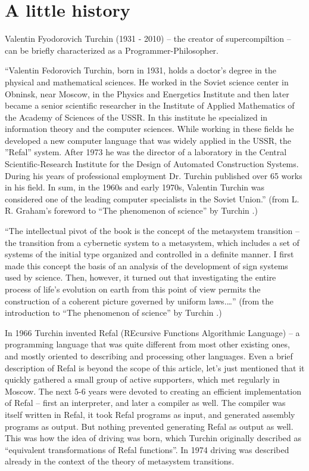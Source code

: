 \section{A little history}

Valentin Fyodorovich Turchin (1931 - 2010) -- the creator of supercompiltion --
can be briefly characterized as a Programmer-Philosopher.

``Valentin Fedorovich Turchin, born in 1931, holds a doctor's degree in the physical and mathematical sciences. 
He worked in the Soviet science center in Obninsk, near Moscow, 
in the Physics and Energetics Institute and then later became a senior scientific researcher 
in the Institute of Applied Mathematics of the Academy of Sciences of the USSR. 
In this institute he specialized in information theory and the computer sciences. 
While working in these fields he developed a new computer language that was widely 
applied in the USSR, the ''Refal'' system. 
After 1973 he was the director of a laboratory in the 
Central Scientific-Research Institute for the Design of Automated Construction Systems. 
During his years of professional employment Dr. Turchin published over 65 works in his field. 
In sum, in the 1960s and early 1970s, Valentin Turchin was considered one of 
the leading computer specialists in the Soviet Union.'' 
(from L. R. Graham's foreword to ``The phenomenon of science'' by Turchin \cite{Turchin1977Phenomenon}.)

``The intellectual pivot of the book is the concept of the metasystem transition
-- the transition from a cybernetic system to a metasystem, which includes a set 
of systems of the initial type organized and controlled in a definite manner. 
I first made this concept the basis of an analysis of the development of sign systems used by science. 
Then, however, it turned out that investigating the entire process of life's evolution on earth 
from this point of view permits the construction of a coherent picture governed by uniform laws.\ldots''
(from the introduction to ``The phenomenon of science'' by Turchin \cite{Turchin1977Phenomenon}.)

In 1966 Turchin invented Refal (REcursive Functions Algorithmic Language) --
a programming language that was quite different from most other existing ones,
and mostly oriented to describing and processing other languages.
Even a brief description of Refal is beyond the scope of this article, 
let's just mentioned that it quickly gathered a small group of active supporters,
which met regularly in Moscow. 
The next 5-6 years were devoted to creating an efficient implementation of Refal
-- first an interpreter, and later a compiler as well.
The compiler was itself written in Refal, it took Refal programs as input,
and generated assembly programs as output.
But nothing prevented generating Refal as output as well.
This was how the idea of driving was born, which Turchin
originally described as ``equivalent transformations of Refal functions''.
In 1974 driving was described already in the context of the
theory of metasystem transitions.

